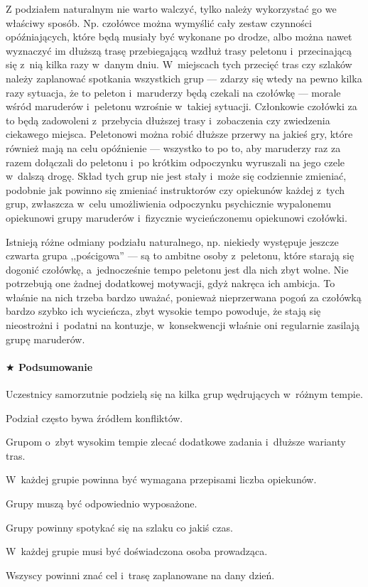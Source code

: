 \documentclass[a5paper,10pt,titlepage,twoside]{article}
\newcommand*{\thecheckbox}{\hss$\Box$} %
\newenvironment*{checklist}
{\list{}{%
\renewcommand*{\makelabel}[1]{\thecheckbox}}}
{\endlist}
\begin{document}
Z podziałem naturalnym nie warto walczyć, tylko należy wykorzystać go we właściwy sposób. Np. czołówce można wymyślić cały zestaw czynności opóźniających, które będą musiały być wykonane po drodze, albo można nawet wyznaczyć im dłuższą trasę przebiegającą wzdłuż trasy peletonu i~przecinającą się z~nią kilka razy w~danym dniu. W~miejscach tych przecięć tras czy szlaków należy zaplanować spotkania wszystkich grup --- zdarzy się wtedy na pewno kilka razy sytuacja, że to peleton i~maruderzy będą czekali na czołówkę --- morale wśród maruderów i~peletonu wzrośnie w~takiej sytuacji. Członkowie czołówki za to będą zadowoleni z~przebycia dłuższej trasy i~zobaczenia czy zwiedzenia ciekawego miejsca. Peletonowi można robić dłuższe przerwy na jakieś gry, które również mają na celu opóźnienie --- wszystko to po to, aby maruderzy raz za razem dołączali do peletonu i~po krótkim odpoczynku wyruszali na jego czele w~dalszą drogę. Skład tych grup nie jest stały i~może się codziennie zmieniać, podobnie jak powinno się zmieniać instruktorów czy opiekunów każdej z~tych grup, zwłaszcza w~celu umożliwienia odpoczynku psychicznie wypalonemu opiekunowi grupy maruderów i~fizycznie wycieńczonemu opiekunowi czołówki.

Istnieją różne odmiany podziału naturalnego, np. niekiedy występuje jeszcze czwarta grupa ,,pościgowa'' --- są to ambitne osoby z~peletonu, które starają się dogonić czołówkę, a~jednocześnie tempo peletonu jest dla nich zbyt wolne. Nie potrzebują one żadnej dodatkowej motywacji, gdyż nakręca ich ambicja. To właśnie na nich trzeba bardzo uważać, ponieważ nieprzerwana pogoń za czołówką bardzo szybko ich wycieńcza, zbyt wysokie tempo powoduje, że stają się nieostrożni i~podatni na kontuzje, w~konsekwencji właśnie oni regularnie zasilają grupę maruderów.

\paragraph{$\bigstar$ Podsumowanie}
\begin{checklist}
\item Uczestnicy samorzutnie podzielą się na kilka grup wędrujących w~różnym tempie.
\item Podział często bywa źródłem konfliktów.
\item Grupom o~zbyt wysokim tempie zlecać dodatkowe zadania i~dłuższe warianty tras.
\item W~każdej grupie powinna być wymagana przepisami liczba opiekunów.
\item Grupy muszą być odpowiednio wyposażone.
\item Grupy powinny spotykać się na szlaku co jakiś czas.
\item W~każdej grupie musi być doświadczona osoba prowadząca.
\item Wszyscy powinni znać cel i~trasę zaplanowane na dany dzień.
\end{checklist}
\end{document}
